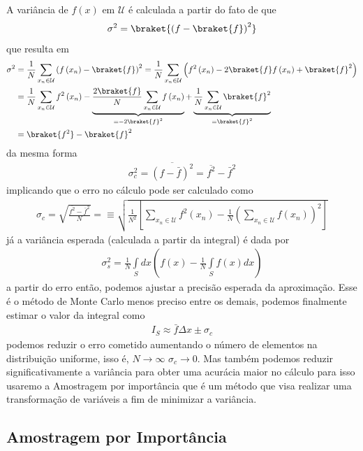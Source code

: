 \documentclass{article}
\begin{document}
A variância de $f\left(x\right)$ em $\mathcal{U}$ é calculada a partir do fato de que
\begin{align}
    \sigma^2=\braket{\left(f-\braket{f}\right)^2}
\end{align}
que resulta em
\begin{align}
    \sigma^2&=\frac{1}{N}\sum_{x_n\in\mathcal{U}}\left(f\left(x_n\right)-\braket{f}\right)^2=\frac{1}{N}\sum_{x_n\in\mathcal{U}}\left(f^2\left(x_n\right)-2\braket{f}f\left(x_n\right)+\braket{f}^2\right)\nonumber \\
    &=\frac{1}{N}\sum_{x_n\in\mathcal{U}}f^2\left(x_n\right)-\underbrace{\frac{2\braket{f}}{N}\sum_{x_n\in\mathcal{U}}f\left(x_n\right)}_{=-2\braket{f}^2}+\underbrace{\frac{1}{N}\sum_{x_n\in\mathcal{U}}\braket{f}^2}_{=\braket{f}^2}\label{eq8}\\
    &=\braket{f^2}-\braket{f}^2\nonumber
\end{align}
da mesma forma
\begin{align}
    \sigma_{c}^2=\overline{\left(f-\bar{f}\right)^2}=\overline{f^2}-\bar{f}^2
\end{align}
implicando que o erro no cálculo pode ser calculado como
\begin{align}
    \sigma_{c}=\sqrt{\frac{\overline{f^2}-\bar{f}^2}{N}}=\equiv\sqrt{\frac{1}{N^2}\left[\sum_{x_n\in\mathcal{U}}f^2\left(x_n\right)-\frac{1}{N}\left(\sum_{x_n\in\mathcal{U}}f\left(x_n\right)\right)^2\right]}
\end{align}
já a variância esperada (calculada a partir da integral)\cite{stern2008cognitive} é dada por
\begin{align}
    \sigma_s^2=\frac{1}{N}\int\limits_{S}dx\left(f(x)-\frac{1}{N}\int\limits_{S}f(x)dx\right)
\end{align}
a partir do erro então, podemos ajustar a precisão esperada da aproximação. Esse é o método de Monte Carlo menos preciso entre os demais, podemos finalmente estimar o valor da integral como
\begin{align}
    I_S\approx \bar{f}\Delta x\pm \sigma_c
\end{align}
podemos reduzir o erro cometido aumentando o número de elementos na distribuição uniforme, isso é, $N\to \infty$ $\sigma_c\to 0$. Mas também podemos reduzir significativamente a variância para obter uma acurácia maior no cálculo para isso usaremo a Amostragem por importância que é um método que visa realizar uma transformação de variáveis a fim de minimizar a variância.

\subsection{Amostragem por Importância}
\end{document}
